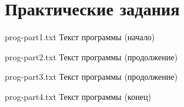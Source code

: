 \chapter{Практические задания}

{prog-part1.txt} %
{Текст программы (начало)} %

\clearpage

{prog-part2.txt} %
{Текст программы (продолжение)} %

\clearpage

{prog-part3.txt} %
{Текст программы (продолжение)} %

\clearpage

{prog-part4.txt} %
{Текст программы (конец)} %

